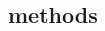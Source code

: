 \documentclass[a4paper]{article}
\begin{document}
\begin{multicols}{2}
%
%
%
%
%
\section{ methods}%
\label{sub:ch4_methods}




\end{multicols}
\end{document}
